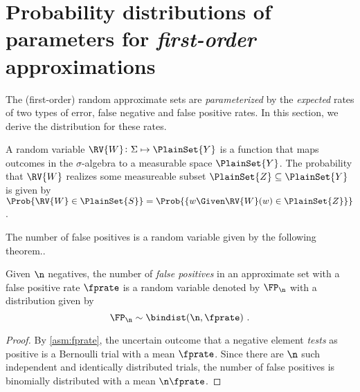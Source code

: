 \documentclass[ ../main.tex]{subfiles}
\begin{document}
\section{Probability distributions of parameters for \emph{first-order} approximations}
\label{sec:characteristics}
The (first-order) random approximate sets are \emph{parameterized} by the \emph{expected} rates of two types of error, false negative and false positive rates.
In this section, we derive the distribution for these rates.

A random variable $\RV{W} \colon \Sigma \mapsto \PlainSet{Y}$ is a function that maps outcomes in the $\sigma$-algebra to a measurable space 
$\PlainSet{Y}$.
The probability that $\RV{W}$ realizes some measureable subset $\PlainSet{Z} \subseteq \PlainSet{Y}$ is given by $\Prob{\RV{W} \in 	\PlainSet{S}} = \Prob{\{w \Given \RV{W}(w) \in \PlainSet{Z}\}}$.

The number of false positives is a random variable given by the following theorem..
\begin{theorem}
\label{thm:fpbinom}
Given $\n$ negatives, the number of \emph{false positives} in an approximate set with a false positive rate $\fprate$ is a random variable denoted by $\FP_\n$ with a distribution given by
\begin{equation}
    \FP_\n \sim \bindist\!\left(\n, \fprate\right)\,.
\end{equation}
\end{theorem}
\begin{proof}
By \cref{asm:fprate}, the uncertain outcome that a negative element \emph{tests} as positive is a Bernoulli trial with a mean $\fprate$.
Since there are $\n$ such independent and identically distributed trials, the number of false positives is binomially distributed with a mean $\n \fprate$.
\end{proof}
\end{document}
